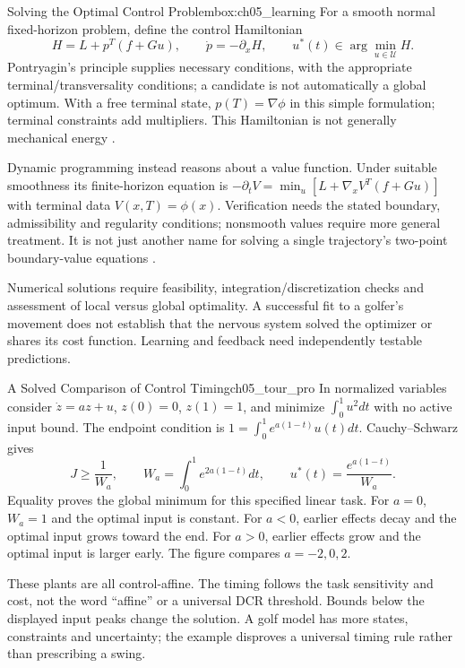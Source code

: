 \begin{laymansbox}{Solving the Optimal Control Problem}{box:ch05_learning}
For a smooth normal fixed-horizon problem, define the control Hamiltonian
\[
 H=L+p^T(f+Gu),\qquad \dot p=-\partial_x H,\qquad
 u^*(t)\in\arg\min_{u\in\mathcal U}H.
\]
Pontryagin's principle supplies necessary conditions, with the appropriate terminal/transversality conditions; a candidate is not automatically a global optimum. With a free terminal state, $p(T)=\nabla\phi$ in this simple formulation; terminal constraints add multipliers. This Hamiltonian is not generally mechanical energy \citep{TedrakeTrajectoryOptimality}.

Dynamic programming instead reasons about a value function. Under suitable smoothness its finite-horizon equation is $-\partial_t V=\min_u[L+\nabla_x V^T(f+Gu)]$ with terminal data $V(x,T)=\phi(x)$. Verification needs the stated boundary, admissibility and regularity conditions; nonsmooth values require more general treatment. It is not just another name for solving a single trajectory's two-point boundary-value equations \citep{TedrakeDynamicProgramming}.

Numerical solutions require feasibility, integration/discretization checks and assessment of local versus global optimality. A successful fit to a golfer's movement does not establish that the nervous system solved the optimizer or shares its cost function. Learning and feedback need independently testable predictions.
\end{laymansbox}

\begin{example}{A Solved Comparison of Control Timing}{ch05_tour_pro}
In normalized variables consider $\dot z=az+u$, $z(0)=0$, $z(1)=1$, and minimize $\int_0^1u^2dt$ with no active input bound. The endpoint condition is $1=\int_0^1e^{a(1-t)}u(t)dt$. Cauchy--Schwarz gives
\[
 J\ge\frac1{W_a},\qquad W_a=\int_0^1e^{2a(1-t)}dt,\qquad
 u^*(t)=\frac{e^{a(1-t)}}{W_a}.
\]
Equality proves the global minimum for this specified linear task. For $a=0$, $W_a=1$ and the optimal input is constant. For $a<0$, earlier effects decay and the optimal input grows toward the end. For $a>0$, earlier effects grow and the optimal input is larger early. The figure compares $a=-2,0,2$.

These plants are all control-affine. The timing follows the task sensitivity and cost, not the word ``affine'' or a universal DCR threshold. Bounds below the displayed input peaks change the solution. A golf model has more states, constraints and uncertainty; the example disproves a universal timing rule rather than prescribing a swing.
\end{example}

